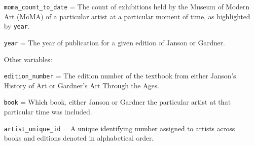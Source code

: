 \documentclass[
  letterpaper,
  DIV=11,
  numbers=noendperiod]{scrreprt}
\begin{document}
\texttt{moma\_count\_to\_date} = The count of exhibitions held by the
Museum of Modern Art (MoMA) of a particular artist at a particular
moment of time, as highlighted by \texttt{year}.

\texttt{year} = The year of publication for a given edition of Janson or
Gardner.

Other variables:

\texttt{edition\_number} = The edition number of the textbook from
either Janson's History of Art or Gardner's Art Through the Ages.

\texttt{book} = Which book, either Janson or Gardner the particular
artist at that particular time was included.

\texttt{artist\_unique\_id} = A unique identifying number assigned to
artists across books and editions denoted in alphabetical order.
\end{document}
